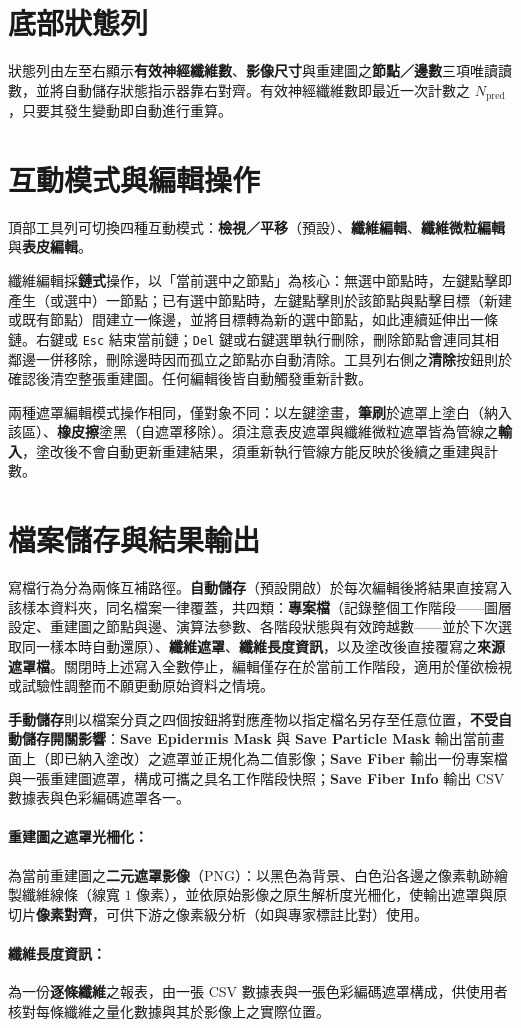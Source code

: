 \section{底部狀態列}
\label{sec:tool-statusbar}

狀態列由左至右顯示\textbf{有效神經纖維數}、\textbf{影像尺寸}與重建圖之\textbf{節點／邊數}三項唯讀讀數，並將自動儲存狀態指示器靠右對齊。有效神經纖維數即最近一次計數之 $N_{\text{pred}}$，只要其發生變動即自動進行重算。

\section{互動模式與編輯操作}
\label{sec:tool-modes}

頂部工具列可切換四種互動模式：\textbf{檢視／平移}（預設）、\textbf{纖維編輯}、\textbf{纖維微粒編輯}與\textbf{表皮編輯}。

纖維編輯採\textbf{鏈式}操作，以「當前選中之節點」為核心：無選中節點時，左鍵點擊即產生（或選中）一節點；已有選中節點時，左鍵點擊則於該節點與點擊目標（新建或既有節點）間建立一條邊，並將目標轉為新的選中節點，如此連續延伸出一條鏈。右鍵或 \texttt{Esc} 結束當前鏈；\texttt{Del} 鍵或右鍵選單執行刪除，刪除節點會連同其相鄰邊一併移除，刪除邊時因而孤立之節點亦自動清除。工具列右側之\textbf{清除}按鈕則於確認後清空整張重建圖。任何編輯後皆自動觸發重新計數。

兩種遮罩編輯模式操作相同，僅對象不同：以左鍵塗畫，\textbf{筆刷}於遮罩上塗白（納入該區）、\textbf{橡皮擦}塗黑（自遮罩移除）。須注意表皮遮罩與纖維微粒遮罩皆為管線之\textbf{輸入}，塗改後不會自動更新重建結果，須重新執行管線方能反映於後續之重建與計數。

\section{檔案儲存與結果輸出}
\label{sec:tool-io}

寫檔行為分為兩條互補路徑。\textbf{自動儲存}（預設開啟）於每次編輯後將結果直接寫入該樣本資料夾，同名檔案一律覆蓋，共四類：\textbf{專案檔}（記錄整個工作階段——圖層設定、重建圖之節點與邊、演算法參數、各階段狀態與有效跨越數——並於下次選取同一樣本時自動還原）、\textbf{纖維遮罩}、\textbf{纖維長度資訊}，以及塗改後直接覆寫之\textbf{來源遮罩檔}。關閉時上述寫入全數停止，編輯僅存在於當前工作階段，適用於僅欲檢視或試驗性調整而不願更動原始資料之情境。

\textbf{手動儲存}則以檔案分頁之四個按鈕將對應產物以指定檔名另存至任意位置，\textbf{不受自動儲存開關影響}：\textbf{Save Epidermis Mask} 與 \textbf{Save Particle Mask} 輸出當前畫面上（即已納入塗改）之遮罩並正規化為二值影像；\textbf{Save Fiber} 輸出一份專案檔與一張重建圖遮罩，構成可攜之具名工作階段快照；\textbf{Save Fiber Info} 輸出 CSV 數據表與色彩編碼遮罩各一。

\paragraph{重建圖之遮罩光柵化：}\label{subsec:io-fibermask}為當前重建圖之\textbf{二元遮罩影像}（PNG）：以黑色為背景、白色沿各邊之像素軌跡繪製纖維線條（線寬 $1$ 像素），並依原始影像之原生解析度光柵化，使輸出遮罩與原切片\textbf{像素對齊}，可供下游之像素級分析（如與專家標註比對）使用。

\paragraph{纖維長度資訊：}\label{subsec:io-fiberinfo}為一份\textbf{逐條纖維}之報表，由一張 CSV 數據表與一張色彩編碼遮罩構成，供使用者核對每條纖維之量化數據與其於影像上之實際位置。

